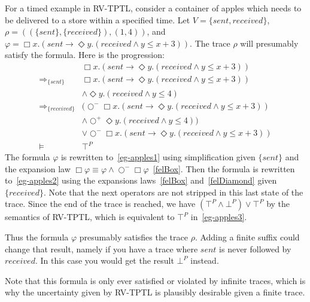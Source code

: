 \documentclass[a4paper]{article}
\newcommand{\sn}{\bigcirc^+}
\newcommand{\wn}{\bigcirc^-}
\newcommand{\rw}[1]{\Rightarrow_{#1}}
\begin{document}
\begin{eg}[Apples]

  For a timed example in RV-TPTL, consider a container of apples which needs to be delivered to a store within a specified time.
  Let $V=\{sent, received\}$,
  \(\rho=((\{sent\},\{received\}),(1,4))\),
  and \(\varphi=\Box x. (sent \to \Diamond y. (received \land y \leq x + 3))\).
  The trace $\rho$ will presumably satisfy the formula.
  Here is the progression:
  \begin{align}
    &\Box x. (sent \to \Diamond y. (received \land y \leq x + 3))\nonumber\\
    \rw{\{sent\}}
    &\Box x. (sent \to \Diamond y. (received \land y \leq x + 3))\nonumber\\
    &\land \Diamond y. (received \land y \leq 4)
    \label{eg-apples1}\\
    \rw{\{received\}}
    &(\wn \Box x. (sent \to \Diamond y. (received \land y \leq x + 3))\nonumber\\
    &\land \sn \Diamond y. (received \land y \leq 4))\nonumber\\
    &\lor \wn \Box x. (sent \to \Diamond y. (received \land y \leq x + 3))\label{eg-apples2}\\
    \vDash
    &\top^P\label{eg-apples3}
  \end{align}
  The formula $\varphi$ is rewritten to~\eqref{eg-apples1} using simplification given $\{sent\}$ and the expansion law $\Box \varphi \equiv \varphi \land \wn \Box \varphi$~\eqref{felBox}.
  Then the formula is rewritten to~\eqref{eg-apples2} using the expansions laws~\eqref{felBox} and~\eqref{felDiamond} given $\{received\}$.
  Note that the next operators are not stripped in this last state of the trace.
  Since the end of the trace is reached, we have $(\top^P \land \bot^P) \lor \top^P$ by the semantics of RV-TPTL, which is equivalent to $\top^P$ in~\eqref{eg-apples3}.

  Thus the formula $\varphi$ presumably satisfies the trace $\rho$.
  Adding a finite suffix could change that result, namely if you have a trace where $sent$ is never followed by $received$.
  In this case you would get the result $\bot^P$ instead.

  Note that this formula is only ever satisfied or violated by infinite traces, which is why the uncertainty given by RV-TPTL is plausibly desirable given a finite trace.
\end{eg}

\end{document}
